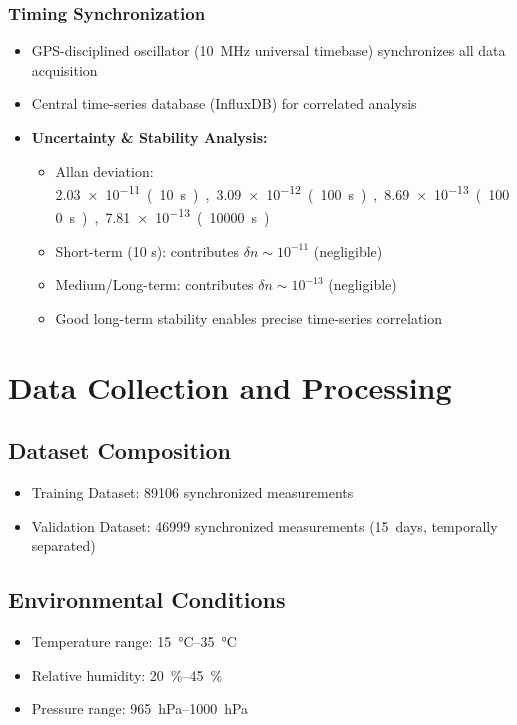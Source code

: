 \documentclass[aps,prl,reprint,groupedaddress,onecolumn,superscriptaddress]{revtex4-2}
\begin{document}
\subsubsection{Timing Synchronization}
\begin{itemize}
    \item GPS-disciplined oscillator (\SI{10}{\mega\hertz} universal timebase) synchronizes all data acquisition
    \item Central time-series database (InfluxDB) for correlated analysis
    \item \textbf{Uncertainty \& Stability Analysis:}
    \begin{itemize}
        \item Allan deviation: \SI{2.03e-11} (10 s), \SI{3.09e-12} (100 s), \SI{8.69e-13} (1000 s), \SI{7.81e-13} (10000 s)
        \item Short-term (10 s): contributes $\delta n \sim 10^{-11}$ (negligible)
        \item Medium/Long-term: contributes $\delta n \sim 10^{-13}$ (negligible)
        \item Good long-term stability enables precise time-series correlation
    \end{itemize}
\end{itemize}

\section{Data Collection and Processing}

\subsection{Dataset Composition}
\begin{itemize}
    \item Training Dataset: \num{89106} synchronized measurements
    \item Validation Dataset: \num{46999} synchronized measurements (\SI{15}{days}, temporally separated)
\end{itemize}

\subsection{Environmental Conditions}
\begin{itemize}
    \item Temperature range: \SIrange{15}{35}{\degreeCelsius}
    \item Relative humidity: \SIrange{20}{45}{\percent}
    \item Pressure range: \SIrange{965}{1000}{\hecto\pascal}
\end{itemize}
\end{document}

